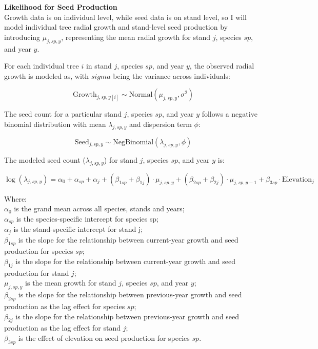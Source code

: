\documentclass[11pt,letter]{article}
\begin{document}
\textbf{Likelihood for Seed Production}\\
Growth data is on individual level, while seed data is on stand level, so I will model individual tree radial growth and stand-level seed production by introducing \(\mu_{j,sp,y}\), representing the mean radial growth for stand \(j\), species \(sp\), and year \(y\).


For each individual tree \(i\) in stand \(j\), species \(sp\), and year \(y\), the observed radial growth is modeled as, with \(sigma\) being the variance across individuals:

\[
\text{Growth}_{j,sp,y[i]} \sim \text{Normal}(\mu_{j,sp,y}, \sigma^2)
\]

The seed count for a particular stand \(j\), species \(sp\), and year \(y\) follows a negative binomial distribution with mean \(\lambda_{j,sp,y}\) and dispersion term \(\phi\):

\[
\text{Seed}_{j,sp,y} \sim \text{NegBinomial}(\lambda_{j,sp,y}, \phi)
\]

The modeled seed count (\(\lambda_{j,sp,y}\)) for stand \(j\), species \(sp\), and year \(y\) is:

\[
\log(\lambda_{j, sp, y}) =\alpha_{0} + \alpha_{sp} + \alpha_{j} + (\beta_{1 sp} + \beta_{1 j}) \cdot \mu_{j,sp,y} + (\beta_{2 sp} + \beta_{2 j}) \cdot \mu_{j,sp,y-1} + \beta_{3 sp} \cdot \text{Elevation}_{j}
\]

Where:\\
\(\alpha_{0}\) is the grand mean across all species, stands and years;\\
\(\alpha_{sp}\) is the species-specific intercept for species sp;\\
\(\alpha_{j}\) is the stand-specific intercept for stand j;\\
\(\beta_{1 sp}\) is the slope for the relationship between current-year growth and seed production for species \(sp\);\\
\(\beta_{1 j}\) is the slope for the relationship between current-year growth and seed production for stand \(j\);\\
\(\mu_{j,sp,y}\) is the mean growth for stand \(j\), species \(sp\), and year \(y\);\\
\(\beta_{2 sp}\) is the slope for the relationship between previous-year growth and seed production as the lag effect for species \(sp\);\\
\(\beta_{2 j}\) is the slope for the relationship between previous-year growth and seed production as the lag effect for stand \(j\);\\
\(\beta_{3 sp}\) is the effect of elevation on seed production for species \(sp\).\\
\end{document}
